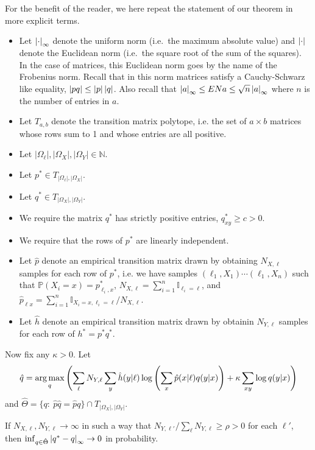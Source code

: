 \label{sec:proof}

For the benefit of the reader, we here repeat the statement of our theorem in more explicit terms.  

\begin{itemize}
\item Let $\left|\cdot\right|_\infty$ denote the uniform norm (i.e.\ the maximum absolute value) and $\left|\cdot\right|$ denote the Euclidean norm (i.e.\ the square root of the sum of the squares).  In the case of matrices, this Euclidean norm goes by the name of the Frobenius norm.  Recall that in this norm matrices satisfy a Cauchy-Schwarz like equality, $\left|pq\right|\leq\left|p\right|\left|q\right|$.  Also recall that $\left|a\right|_\infty \leq EN{a} \leq \sqrt{n}\left|a\right|_\infty$ where $n$ is the number of entries in $a$.
\item Let $T_{a,b}$ denote the transition matrix polytope, i.e. the set of $a\times b$ matrices whose rows sum to 1 and whose entries are all positive.
\item Let $|\Omega_\ell|,|\Omega_X|,|\Omega_Y| \in \mathbb{N}$.
\item Let $p^*\in T_{|\Omega_\ell|,|\Omega_X|}$.
\item Let $q^*\in T_{|\Omega_X|,|\Omega_Y|}$.
\item We require the matrix $q^*$ has strictly positive entries, $q^*_{xy}\geq c>0$.
\item We require that the rows of $p^*$ are linearly independent.
\item Let $\hat p$ denote an empirical transition matrix drawn by obtaining $N_{X,\ell}$ samples for each row of $p^*$, i.e. we have samples $(\ell_1,X_1) \cdots (\ell_1,X_n)$ such that $\mathbb{P}(X_i=x) = p^*_{\ell_i,x}$, $N_{X,\ell}=\sum_{i=1}^n \mathbb{I}_{\ell_i=\ell}$, and $\hat p_{\ell x} = \sum_{i=1}^n \mathbb{I}_{X_i=x,\ell_i=\ell} / N_{X,\ell}$. 
\item Let $\hat h$ denote an empirical transition matrix drawn by obtainin $N_{Y,\ell}$ samples for each row of $h^*=p^*q^*$.  
\end{itemize}

Now fix any $\kappa>0$.  Let
\begin{align}
\hat q = \operatorname*{arg\,max}_q \left(\sum_\ell N_{Y,\ell}\sum_{y}\hat h(y|\ell)\log\left(\sum_{x}\hat p(x|\ell)q(y|x)\right) + \kappa \sum_{xy} \log q(y|x)\right)\label{eq:mindef}
\end{align}
and $\hat \Theta=\{q:\ \hat p\hat q=\hat pq\} \cap T_{|\Omega_X|,|\Omega_Y|}$.  
\vspace{.1in}
\begin{thm}
If $N_{X,\ell},N_{Y,\ell}\rightarrow \infty$ in such a way that $N_{Y,\ell'}/\sum_{\ell}N_{Y,\ell} \geq \rho>0$ for each $\ell'$, then $\inf_{q\in \hat\Theta} \left|q^*-q\right|_\infty\rightarrow 0$ in probability.
\end{thm}

